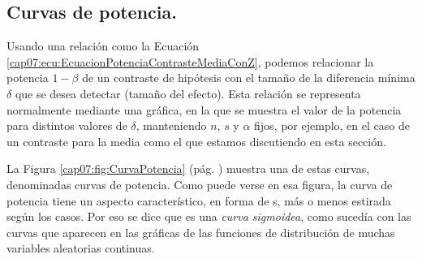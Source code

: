 
%
%
%

\subsection{Curvas de potencia.}
\label{cap07:subsec:CurvasPotencia}

Usando una relación como la Ecuación \ref{cap07:ecu:EcuacionPotenciaContrasteMediaConZ}, podemos relacionar la potencia $1-\beta$ de un contraste de hipótesis con el tamaño de la diferencia mínima $\delta$ que se desea detectar (tamaño del efecto). Esta relación se representa normalmente mediante una gráfica, en la que se muestra el valor de la potencia para distintos valores de $\delta$, manteniendo $n$, $s$ y $\alpha$ fijos, por ejemplo, en el caso de un contraste para la media como el que estamos discutiendo en esta sección.

La Figura \ref{cap07:fig:CurvaPotencia} (pág. \pageref{cap07:fig:CurvaPotencia}) muestra una de estas curvas, denominadas {\sf curvas de potencia}. Como puede verse en esa figura, la curva de potencia tiene un aspecto característico, en forma de s, más o menos estirada según los casos.  Por eso se dice que es una {\em curva sigmoidea}, como sucedía con las curvas que aparecen en las gráficas de las funciones de distribución de muchas variables aleatorias continuas.

